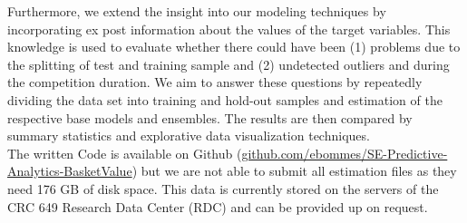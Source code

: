 \documentclass[12pt]{article}
\begin{document}
Furthermore, we extend the insight into our modeling techniques by incorporating ex post information about the values of the target variables. This knowledge is used to evaluate whether there could have been (1) problems due to the splitting of test and training sample and (2) undetected outliers and during the competition duration. We aim to answer these questions by repeatedly dividing the data set into training and hold-out samples and estimation of the respective base models and ensembles. The results are then compared by summary statistics and explorative data visualization techniques. \\

The written Code is available on Github (\href{https://github.com/ebommes/SE-Predictive-Analytics-BasketValue}{github.com/ebommes/SE-Predictive-Analytics-BasketValue}) but we are not able to submit all estimation files as they need 176 GB of disk space. This data is currently stored on the servers of the CRC 649 Research Data Center (RDC) and can be provided up on request.
\end{document}
